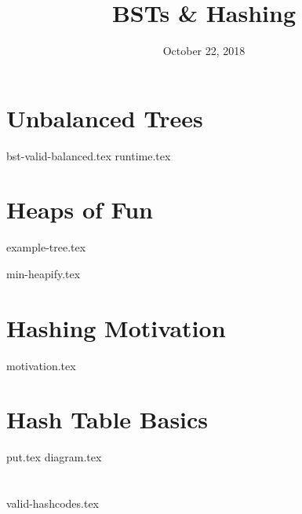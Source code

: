 \documentclass[11pt]{exam}
\title{BSTs \& Hashing}
\date{October 22, 2018}
\begin{document}
\maketitle

\section{Unbalanced Trees}
\begin{questions}
{bst-valid-balanced.tex}
{runtime.tex}
\end{questions}

\newpage
\section{Heaps of Fun}
{example-tree.tex}
\begin{questions}
{min-heapify.tex}
\end{questions}

\section{Hashing Motivation}
\begin{questions}
{motivation.tex}
\end{questions}

\section{Hash Table Basics}
\begin{questions}
{put.tex}
{diagram.tex}
\end{questions}

\section{}
\begin{questions}
{valid-hashcodes.tex}
\end{questions}
\end{document}
